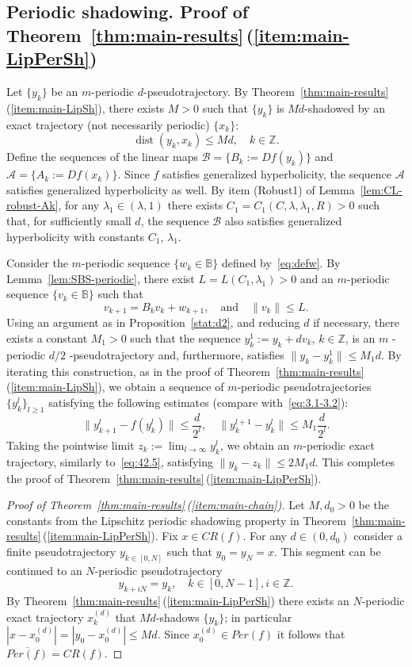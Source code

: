 \documentclass[12pt]{article}
\newcommand{\Zz}{\mathbb{Z}}
\DeclareMathOperator{\dist}{dist}
\theoremstyle{definition}
\begin{document}
\subsection{Periodic shadowing. Proof of Theorem~\ref{thm:main-results}\,(\ref{item:main-LipPerSh})}\label{sec:LipPerSh}

Let $\{y_k\}$ be an $m$-periodic $d$-pseudotrajectory. By Theorem~\ref{thm:main-results}\,(\ref{item:main-LipSh}), there exists  $M > 0$ such that $\{y_k\}$ is $Md$-shadowed by an exact trajectory (not necessarily periodic) $\{x_k\}$: 
$$
\dist(y_k, x_k) \leq Md, \quad k \in \mathbb{Z}.
$$
Define the sequences of the linear maps $\mathcal{B} = \{B_k := Df(y_k)\}$ and $\mathcal{A} = \{A_k := Df(x_k)\}$. Since $f$ satisfies generalized hyperbolicity, the sequence $\mathcal{A}$ satisfies generalized hyperbolicity as well. By item (Robust1) of Lemma~\ref{lem:CL-robust-Ak}, for any $\lambda_1 \in (\lambda, 1)$ there exists $C_1 = C_1(C, \lambda, \lambda_1, R) > 0$ such that, for sufficiently small $d$, the sequence $\mathcal{B}$ also satisfies generalized hyperbolicity with constants $C_1$, $\lambda_1$.

Consider the $m$-periodic sequence $\{w_k \in \mathbb{B}\}$ defined by~\eqref{eq:defw}. By Lemma~\ref{lem:SBS-periodic}, there exist $L = L(C_1, \lambda_1) > 0$ and an $m$-periodic sequence $\{v_k \in \mathbb{B}\}$ such that
$$
v_{k+1} = B_k v_k + w_{k+1}, \quad \text{and} \quad \|v_k\| \leq L.
$$
Using an argument as in Proposition~\ref{stat:d2}, and reducing $d$ if necessary, there exists a constant $M_1 > 0$ such that the sequence $y_k^1 := y_k + d v_k$, $k \in \mathbb{Z}$, is an $m$ -periodic $d/2$ -pseudotrajectory and, furthermore, satisfies $\|y_k - y_k^1\| \leq M_1 d$.
By iterating this construction, as in the proof of Theorem~\ref{thm:main-results}\,(\ref{item:main-LipSh}), we obtain a sequence of $m$-periodic pseudotrajectories $\{y_k^l\}_{l \geq 1}$ satisfying the following estimates (compare with~\eqref{eq:3.1-3.2}):
$$
\|y_{k+1}^l - f(y_k^l)\| \leq \frac{d}{2^l}, \quad \|y_k^{l+1} - y_k^l\| \leq M_1 \frac{d}{2^l}.
$$
Taking the pointwise limit $z_k := \lim_{l \to \infty} y_k^l$, we obtain an $m$-periodic exact trajectory, similarly to~\eqref{eq:42.5}, satisfying
$
\|y_k - z_k\| \leq 2M_1 d.
$
This completes the proof of Theorem~\ref{thm:main-results}\,(\ref{item:main-LipPerSh}).

\begin{proof}[Proof of Theorem~\ref{thm:main-results}\,(\ref{item:main-chain})]
Let $M, d_0 > 0$ be the constants from the Lipschitz periodic shadowing property in Theorem~\ref{thm:main-results}\,(\ref{item:main-LipPerSh}). Fix $x \in CR(f)$. For any $d \in (0, d_0)$ consider a finite pseudotrajectory $y_{k \in [0, N]}$ such that $y_0 = y_N = x$. This segment can be continued to an $N$-periodic pseudotrajectory 
$$
y_{k+iN} = y_k, \quad k \in [0, N-1], i \in \Zz.
$$
By Theorem~\ref{thm:main-results}\,(\ref{item:main-LipPerSh}) there exists an $N$-periodic exact trajectory $x_k^{(d)}$ that $Md$-shadows $\{y_k\}$; in particular
$
|x - x_0^{(d)}| = |y_0 - x_0^{(d)}| \leq Md
$.
Since $x_0^{(d)} \in Per(f)$ it follows that $\overline{Per(f)} = CR(f)$.
\end{proof}
    
\end{document}
